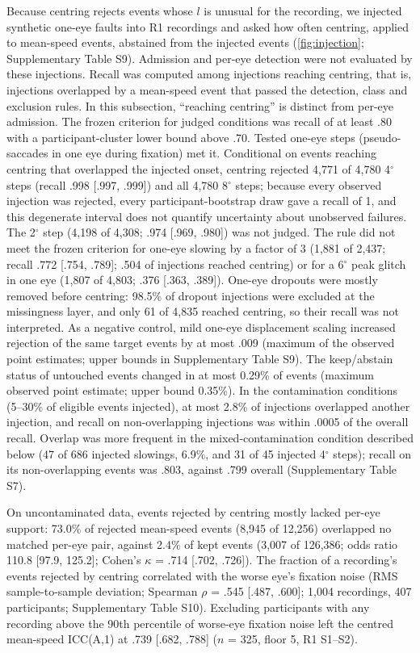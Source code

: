 Because centring rejects events whose $l$ is unusual for the recording, we injected synthetic one-eye faults into R1 recordings and asked how often centring, applied to mean-speed events, abstained from the injected events (\cref{fig:injection}; Supplementary Table S9). Admission and per-eye detection were not evaluated by these injections. Recall was computed among injections reaching centring, that is, injections overlapped by a mean-speed event that passed the detection, class and exclusion rules. In this subsection, ``reaching centring'' is distinct from per-eye admission. The frozen criterion for judged conditions was recall of at least .80 with a participant-cluster lower bound above .70. Tested one-eye steps (pseudo-saccades in one eye during fixation) met it. Conditional on events reaching centring that overlapped the injected onset, centring rejected 4,771 of 4,780 4$^\circ$ steps (recall .998 [.997, .999]) and all 4,780 8$^\circ$ steps; because every observed injection was rejected, every participant-bootstrap draw gave a recall of 1, and this degenerate interval does not quantify uncertainty about unobserved failures. The 2$^\circ$ step (4,198 of 4,308; .974 [.969, .980]) was not judged. The rule did not meet the frozen criterion for one-eye slowing by a factor of 3 (1,881 of 2,437; recall .772 [.754, .789]; .504 of injections reached centring) or for a 6$^\circ$ peak glitch in one eye (1,807 of 4,803; .376 [.363, .389]). One-eye dropouts were mostly removed before centring: 98.5\% of dropout injections were excluded at the missingness layer, and only 61 of 4,835 reached centring, so their recall was not interpreted. As a negative control, mild one-eye displacement scaling increased rejection of the same target events by at most .009 (maximum of the observed point estimates; upper bounds in Supplementary Table S9). The keep/abstain status of untouched events changed in at most 0.29\% of events (maximum observed point estimate; upper bound 0.35\%). In the contamination conditions (5--30\% of eligible events injected), at most 2.8\% of injections overlapped another injection, and recall on non-overlapping injections was within .0005 of the overall recall. Overlap was more frequent in the mixed-contamination condition described below (47 of 686 injected slowings, 6.9\%, and 31 of 45 injected 4$^\circ$ steps); recall on its non-overlapping events was .803, against .799 overall (Supplementary Table S7).



On uncontaminated data, events rejected by centring mostly lacked per-eye support: 73.0\% of rejected mean-speed events (8,945 of 12,256) overlapped no matched per-eye pair, against 2.4\% of kept events (3,007 of 126,386; odds ratio 110.8 [97.9, 125.2]; Cohen's $\kappa$ = .714 [.702, .726]). The fraction of a recording's events rejected by centring correlated with the worse eye's fixation noise (RMS sample-to-sample deviation; Spearman $\rho$ = .545 [.487, .600]; 1,004 recordings, 407 participants; Supplementary Table S10). Excluding participants with any recording above the 90th percentile of worse-eye fixation noise left the centred mean-speed ICC(A,1) at .739 [.682, .788] ($n$ = 325, floor 5, R1 S1--S2).

